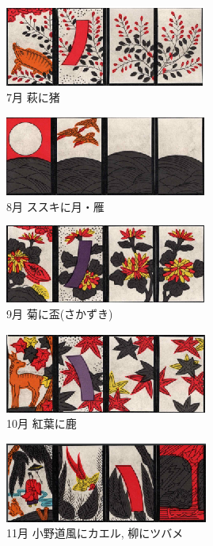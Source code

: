 \documentclass[a4j]{jarticle}
\begin{document}
    \begin{figure}[H]
      \centering
      \includegraphics[scale=1.5]{./img/jul.eps}
      \caption{7月 萩に猪}
      \label{jul}
      \end{figure}
  
      \begin{figure}[H]
      \centering
      \includegraphics[scale=1.5]{./img/aug.eps}
      \caption{8月 ススキに月・雁}
      \label{aug}
      \end{figure}
  
      \begin{figure}[H]
      \centering
      \includegraphics[scale=1.5]{./img/sep.eps}
      \caption{9月 菊に盃(さかずき)}
      \label{sep}
      \end{figure}

    \begin{figure}[H]
      \centering
      \includegraphics[scale=1.5]{./img/oct.eps}
      \caption{10月 紅葉に鹿}
      \label{oct}
      \end{figure}
  
      \begin{figure}[H]
      \centering
      \includegraphics[scale=1.5]{./img/nov.eps}
      \caption{11月 小野道風にカエル, 柳にツバメ}
      \label{nov}
      \end{figure}
  
\end{document}
